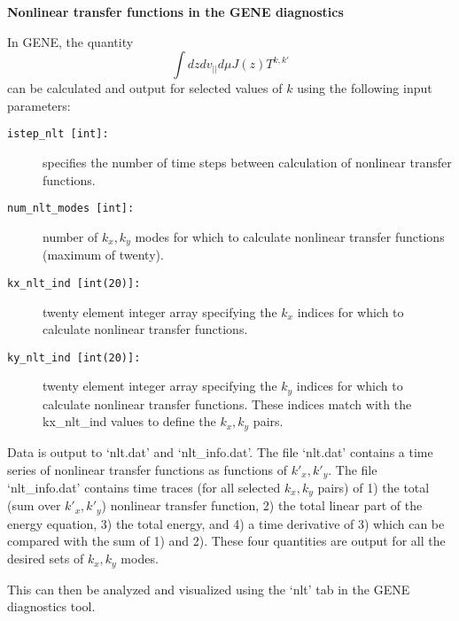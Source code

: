 \documentclass[11pt]{article}
\begin{document}
\begin{titlepage}
\centerline{\bf Nonlinear transfer functions in the GENE diagnostics }
In GENE, the quantity
\begin{equation}
\int dz dv_{||} d\mu J(z) T^{k,k'}
\label{}
\end{equation}
can be calculated and output for selected values of $k$ using the following input parameters: 
\begin{description}
\item[\texttt{istep\_nlt [int]:}] specifies the number of time steps between calculation of nonlinear transfer functions.
\item[\texttt{num\_nlt\_modes [int]:}] number of $k_x,k_y$ modes for which to calculate nonlinear transfer functions (maximum of twenty).
\item[\texttt{kx\_nlt\_ind [int(20)]:}] twenty element integer array specifying the $k_x$ indices for which to calculate nonlinear transfer functions.
\item[\texttt{ky\_nlt\_ind [int(20)]:}] twenty element integer array specifying the $k_y$ indices for which to calculate nonlinear transfer functions.  These indices match with the kx\_nlt\_ind values to define the $k_x,k_y$ pairs.
\end{description}
Data is output to `nlt.dat' and `nlt\_info.dat'.  The file `nlt.dat' contains a time series of nonlinear transfer functions as functions of $k'_x,k'_y$.  The file `nlt\_info.dat' contains time traces (for all selected $k_x,k_y$ pairs) of 1) the total (sum over $k'_x,k'_y$) nonlinear transfer function, 2) the total linear part of the energy equation, 3) the total energy, and 4) a time derivative of 3) which can be compared with the sum of 1) and 2).  These four quantities are output for all the desired sets of $k_x,k_y$ modes.   

This can then be analyzed and visualized using the `nlt' tab in the GENE diagnostics tool.






\end{titlepage}
\end{document}
